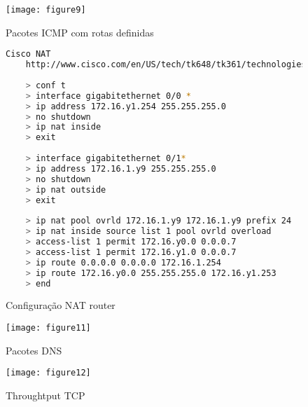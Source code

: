 \begin{figure}[ht]
	\texttt{[image: figure9]}                                                      
    \caption{Pacotes ICMP com rotas definidas}
    \label{fig:fig9}
\end{figure}

\begin{figure}[ht]
	\begin{lstlisting}[language=bash]
	Cisco NAT
	http://www.cisco.com/en/US/tech/tk648/tk361/technologies_tech_note09186a0080094e77.shtml
	
	> conf t
	> interface gigabitethernet 0/0 *
	> ip address 172.16.y1.254 255.255.255.0
	> no shutdown
	> ip nat inside
	> exit
	
	> interface gigabitethernet 0/1*
	> ip address 172.16.1.y9 255.255.255.0
	> no shutdown
	> ip nat outside
	> exit
	
	> ip nat pool ovrld 172.16.1.y9 172.16.1.y9 prefix 24
	> ip nat inside source list 1 pool ovrld overload
	> access-list 1 permit 172.16.y0.0 0.0.0.7
	> access-list 1 permit 172.16.y1.0 0.0.0.7
	> ip route 0.0.0.0 0.0.0.0 172.16.1.254
	> ip route 172.16.y0.0 255.255.255.0 172.16.y1.253
	> end
	\end{lstlisting}
    \caption{Configuração NAT router}
    \label{fig:fig10}
\end{figure}

\begin{figure}[ht]
	\texttt{[image: figure11]}                                                      
    \caption{Pacotes DNS}
    \label{fig:fig11}
\end{figure}

\begin{figure}[ht]
	\texttt{[image: figure12]}                                                      
    \caption{Throughtput TCP}
    \label{fig:fig12}
\end{figure}

